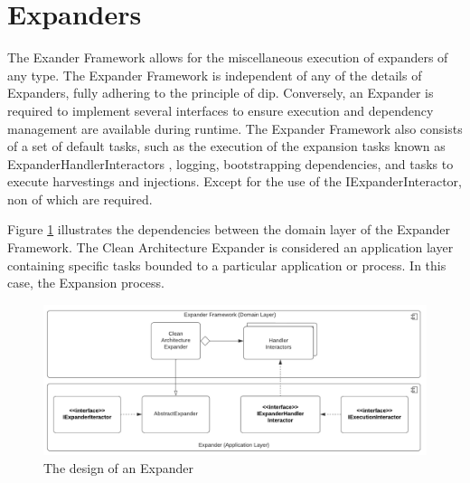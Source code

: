 \section{Expanders}

The Exander Framework allows for the miscellaneous execution of expanders of any type. The
Expander Framework is independent of any of the details of Expanders, fully adhering to
the principle of \gls{dip}. Conversely, an Expander is required to implement several
interfaces to ensure execution and dependency management are available during runtime. The
Expander Framework also consists of a set of default tasks, such as the execution of the
expansion tasks known as ExpanderHandlerInteractors
, logging, bootstrapping dependencies, and
tasks to execute harvestings and injections. Except for the use of the
IExpanderInteractor, non of which are required.

Figure \ref{fig_expander_design} illustrates the dependencies between the domain layer of
the Expander Framework. The Clean Architecture Expander is considered an application layer
containing specific tasks bounded to a particular application or process. In this case,
the Expansion process.

\begin{figure}[H]
    \centering
    \includegraphics[width=1\textwidth]{figures/expander.pdf}
    \caption[The design of an Expander]{The design of an Expander}
    \label{fig_expander_design}
  \end{figure}